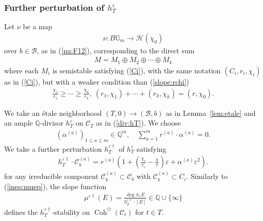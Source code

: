 \documentclass[11pt,oneside,a4paper,mathscr]{amsart}
\theoremstyle{definition}
\renewcommand{\leq}{\leqslant}
\renewcommand{\geq}{\geqslant}
\newcommand{\cH}{\mathcal{H}}
\newcommand{\cB}{\mathcal{B}}
\newcommand{\cC}{\mathcal{C}}
\newcommand{\bgm}{B\mathbb{G}_m}
\newcommand{\Coh}{\operatorname{Coh}}
\begin{document}
\subsubsection*{Further perturbation of $h_T^{\varepsilon}$}
Let $\nu$ be a map 
\begin{align}\label{map:v2}
    \nu \colon \bgm \to \cH(\chi_0)
\end{align}
over $b\in \cB$, 
as in (\ref{nu:F12}), 
corresponding to the direct sum 
\begin{align*}M=M_1\oplus M_2 \oplus \cdots \oplus M_k
\end{align*}
where each $M_i$ is semistable satisfying (\ref{Ci}), 
with the same notation $(C_i, r_i, \chi_i)$ as in (\ref{Ci}), 
but with a weaker condition than (\ref{slope:rchi})
\begin{align*}
    \frac{\chi_1}{r_1} \geq \cdots \geq \frac{\chi_k}{r_k}, \ (r_1, \chi_1)+\cdots+(r_k, \chi_k)=(r, \chi_0).
\end{align*}


We take an \'{e}tale neighborhood $(T, 0) \to (\cB, b)$ as in Lemma~\ref{lem:etale} 
and an ample $\mathbb{Q}$-divisor $h_T^{\varepsilon}$ on $\cC_T$
as in (\ref{div:hT}). 
We choose 
\begin{align}\label{choice:alpha}
    (\alpha^{(a)})_{1\leq a\leq m} \in \mathbb{Q}^m, \quad 
    \sum_{a=1}^m r^{(a)} \cdot \alpha^{(a)}=0.
\end{align}
We take a further perturbation $h_T^{\varepsilon \dag}$ of $h_T^{\varepsilon}$
satisfying
\begin{align}\label{hTeps}
    h_T^{\varepsilon \dag}\cdot \cC_b^{(a)}=r^{(a)}\left(1+\left(\frac{\chi_i}{r_i}-\frac{\chi}{r}  \right)\varepsilon +\alpha^{(a)}\varepsilon^2   \right).
\end{align}
for any irreducible component $\cC_b^{(a)} \subset \cC_b$
with $\cC_b^{(a)} \subset C_i$. 
Similarly to (\ref{ineq:muep}), the slope function 
\begin{align*}
    \mu^{\varepsilon \dag}(E)=\frac{\deg \pi_{*}E}{h_T^{\varepsilon \dag} \cdot [E]} \in \mathbb{Q} \cup \{\infty\}
\end{align*}
defines the $h_{T}^{\varepsilon \dag}$-stability on $\Coh^{\heartsuit}(\cC_t)$ for $t\in T$. 
\end{document}
